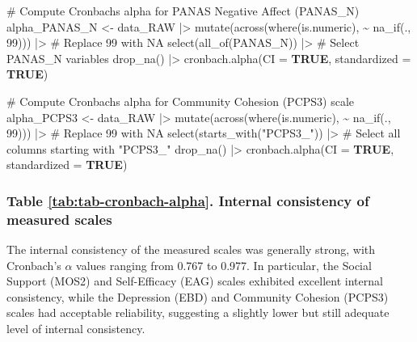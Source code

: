 \documentclass[
  bookmarksnumbered]{article}
\newenvironment{Shaded}{\begin{snugshade}}{\end{snugshade}}
\newcommand{\AttributeTok}[1]{\textcolor[rgb]{0.80,0.80,0.80}{#1}}
\newcommand{\CommentTok}[1]{\textcolor[rgb]{0.50,0.62,0.50}{#1}}
\newcommand{\ConstantTok}[1]{\textcolor[rgb]{0.86,0.64,0.64}{\textbf{#1}}}
\newcommand{\DecValTok}[1]{\textcolor[rgb]{0.86,0.86,0.80}{#1}}
\newcommand{\FunctionTok}[1]{\textcolor[rgb]{0.94,0.94,0.56}{#1}}
\newcommand{\NormalTok}[1]{\textcolor[rgb]{0.80,0.80,0.80}{#1}}
\newcommand{\OtherTok}[1]{\textcolor[rgb]{0.94,0.94,0.56}{#1}}
\newcommand{\SpecialCharTok}[1]{\textcolor[rgb]{0.86,0.64,0.64}{#1}}
\newcommand{\StringTok}[1]{\textcolor[rgb]{0.80,0.58,0.58}{#1}}
\begin{document}
\begin{Shaded}
\begin{Highlighting}[]
\CommentTok{\# Compute Cronbach\textquotesingle{}s alpha for PANAS Negative Affect (PANAS\_N)}
\NormalTok{alpha\_PANAS\_N }\OtherTok{\textless{}{-}}\NormalTok{ data\_RAW }\SpecialCharTok{|\textgreater{}} 
  \FunctionTok{mutate}\NormalTok{(}\FunctionTok{across}\NormalTok{(}\FunctionTok{where}\NormalTok{(is.numeric), }\SpecialCharTok{\textasciitilde{}} \FunctionTok{na\_if}\NormalTok{(., }\DecValTok{99}\NormalTok{))) }\SpecialCharTok{|\textgreater{}}  \CommentTok{\# Replace 99 with NA}
  \FunctionTok{select}\NormalTok{(}\FunctionTok{all\_of}\NormalTok{(PANAS\_N)) }\SpecialCharTok{|\textgreater{}}  \CommentTok{\# Select PANAS\_N variables}
  \FunctionTok{drop\_na}\NormalTok{() }\SpecialCharTok{|\textgreater{}}
  \FunctionTok{cronbach.alpha}\NormalTok{(}\AttributeTok{CI =} \ConstantTok{TRUE}\NormalTok{, }\AttributeTok{standardized =} \ConstantTok{TRUE}\NormalTok{)}

\CommentTok{\# Compute Cronbach\textquotesingle{}s alpha for Community Cohesion (PCPS3) scale}
\NormalTok{alpha\_PCPS3 }\OtherTok{\textless{}{-}}\NormalTok{ data\_RAW }\SpecialCharTok{|\textgreater{}} 
  \FunctionTok{mutate}\NormalTok{(}\FunctionTok{across}\NormalTok{(}\FunctionTok{where}\NormalTok{(is.numeric), }\SpecialCharTok{\textasciitilde{}} \FunctionTok{na\_if}\NormalTok{(., }\DecValTok{99}\NormalTok{))) }\SpecialCharTok{|\textgreater{}}  \CommentTok{\# Replace 99 with NA}
  \FunctionTok{select}\NormalTok{(}\FunctionTok{starts\_with}\NormalTok{(}\StringTok{"PCPS3\_"}\NormalTok{)) }\SpecialCharTok{|\textgreater{}}  \CommentTok{\# Select all columns starting with "PCPS3\_"}
  \FunctionTok{drop\_na}\NormalTok{() }\SpecialCharTok{|\textgreater{}}
  \FunctionTok{cronbach.alpha}\NormalTok{(}\AttributeTok{CI =} \ConstantTok{TRUE}\NormalTok{, }\AttributeTok{standardized =} \ConstantTok{TRUE}\NormalTok{)}
\end{Highlighting}
\end{Shaded}

\subsubsection{Table \ref{tab:tab-cronbach-alpha}. Internal consistency of measured scales}\label{table-reftabtab-cronbach-alpha.-internal-consistency-of-measured-scales}

The internal consistency of the measured scales was generally strong, with Cronbach's \(\alpha\) values ranging from 0.767 to 0.977. In particular, the Social Support (MOS2) and Self-Efficacy (EAG) scales exhibited excellent internal consistency, while the Depression (EBD) and Community Cohesion (PCPS3) scales had acceptable reliability, suggesting a slightly lower but still adequate level of internal consistency.
\end{document}
